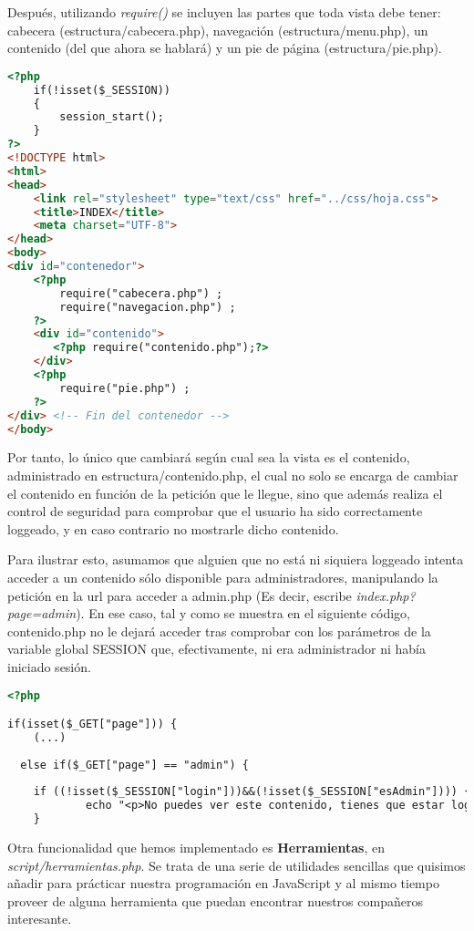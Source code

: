 \documentclass[12pt]{report}
\begin{document}
Después, utilizando \textit{require()} se incluyen las partes que toda vista debe tener: cabecera (estructura/cabecera.php), navegación (estructura/menu.php), un contenido (del que ahora se hablará) y  un pie de página (estructura/pie.php).
\newline
\begin{lstlisting}[language=HTML]
<?php
    if(!isset($_SESSION)) 
    { 
        session_start(); 
    } 
?>
<!DOCTYPE html>
<html>
<head>
    <link rel="stylesheet" type="text/css" href="../css/hoja.css">
    <title>INDEX</title>
    <meta charset="UTF-8">
</head>
<body>
<div id="contenedor">
    <?php 
        require("cabecera.php") ;
	 	require("navegacion.php") ;
	?>
	<div id="contenido">
	   <?php require("contenido.php");?>
	</div>
	<?php 
	 	require("pie.php") ;
	?>
</div> <!-- Fin del contenedor -->
</body>
\end{lstlisting}

Por tanto, lo único que cambiará según cual sea la vista es el contenido, administrado en estructura/contenido.php, el cual no solo se encarga de cambiar el contenido en función de la petición que le llegue, sino que además realiza el control de seguridad para comprobar que el usuario ha sido correctamente loggeado, y en caso contrario no mostrarle dicho contenido.

Para ilustrar esto, asumamos que alguien que no está ni siquiera loggeado intenta acceder a un contenido sólo disponible para administradores, manipulando la petición en la url para acceder a admin.php (Es decir, escribe \textit{index.php?page=admin}). En ese caso, tal y como se muestra en el siguiente código, contenido.php no le dejará acceder tras comprobar con los parámetros de la variable global SESSION que, efectivamente, ni era administrador ni había iniciado sesión.
\newline
\begin{lstlisting}[language=HTML]
<?php 

if(isset($_GET["page"])) {
    (...)
    
  else if($_GET["page"] == "admin") {
    
    if ((!isset($_SESSION["login"]))&&(!isset($_SESSION["esAdmin"]))) {
            echo "<p>No puedes ver este contenido, tienes que estar loggeado y ser Administrador para visualizarlo.</p>";
    }
\end{lstlisting}

Otra funcionalidad que hemos implementado es \textbf{Herramientas}, en \textit{script/herramientas.php}. Se trata de una serie de utilidades sencillas que quisimos añadir para prácticar nuestra programación en JavaScript y al mismo tiempo proveer de alguna herramienta que puedan encontrar nuestros compañeros interesante. 
\end{document}
